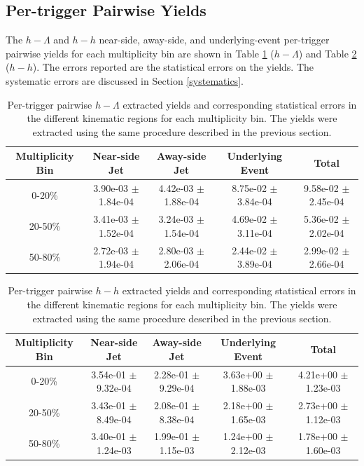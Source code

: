 \documentclass[ALICE,manyauthors]{ALICE_analysis_notes}
\begin{document}
\subsection{Per-trigger Pairwise Yields}
The $h-\Lambda$ and $h-h$ near-side, away-side, and underlying-event per-trigger pairwise yields for each multiplicity bin are shown in Table \ref{h_lambda_yield_table} ($h-\Lambda$) and Table \ref{h_h_yield_table} ($h-h$). The errors reported are the statistical errors on the yields. The systematic errors are discussed in Section \ref{systematics}.

\begin{table}[h!]
\centering
\begin{tabular}{| c | c | c | c | c | }
\hline
Multiplicity Bin & Near-side Jet & Away-side Jet & Underlying Event & Total  \\
\hline

0-20\% & 3.90e-03 $\pm$ 1.84e-04 & 4.42e-03 $\pm$ 1.88e-04 & 8.75e-02 $\pm$ 3.84e-04 & 9.58e-02 $\pm$ 2.45e-04 \\
20-50\% & 3.41e-03 $\pm$ 1.52e-04 & 3.24e-03 $\pm$ 1.54e-04 & 4.69e-02 $\pm$ 3.11e-04 & 5.36e-02 $\pm$ 2.02e-04 \\
50-80\% & 2.72e-03 $\pm$ 1.94e-04 & 2.80e-03 $\pm$ 2.06e-04 & 2.44e-02 $\pm$ 3.89e-04 & 2.99e-02 $\pm$ 2.66e-04 \\

\hline
\end{tabular}
\caption{Per-trigger pairwise $h-\Lambda$ extracted yields and corresponding statistical errors in the different kinematic regions for each multiplicity bin. The yields were extracted using the same procedure described in the previous section.}
\label{h_lambda_yield_table}
\end{table}

\begin{table}[h!]
\centering
\begin{tabular}{| c | c | c | c | c | }
\hline
Multiplicity Bin & Near-side Jet & Away-side Jet & Underlying Event & Total  \\
\hline

0-20\% & 3.54e-01 $\pm$ 9.32e-04 & 2.28e-01 $\pm$ 9.29e-04 & 3.63e+00 $\pm$ 1.88e-03 & 4.21e+00 $\pm$ 1.23e-03 \\
20-50\% & 3.43e-01 $\pm$ 8.49e-04 & 2.08e-01 $\pm$ 8.38e-04 & 2.18e+00 $\pm$ 1.65e-03 & 2.73e+00 $\pm$ 1.12e-03 \\
50-80\% & 3.40e-01 $\pm$ 1.24e-03 & 1.99e-01 $\pm$ 1.15e-03 & 1.24e+00 $\pm$ 2.12e-03 & 1.78e+00 $\pm$ 1.60e-03 \\

\hline
\end{tabular}
\caption{Per-trigger pairwise $h-h$ extracted yields and corresponding statistical errors in the different kinematic regions for each multiplicity bin. The yields were extracted using the same procedure described in the previous section.}
\label{h_h_yield_table}
\end{table}
\end{document}
